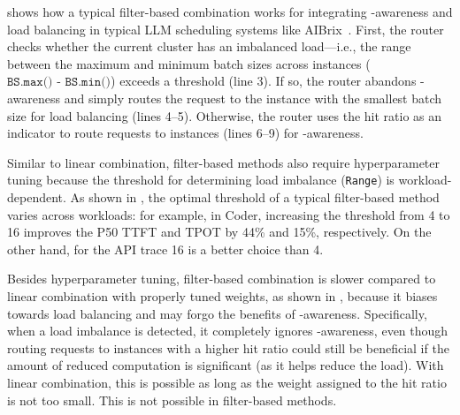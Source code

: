 {} shows how a typical filter-based combination works for
integrating {\kvcache}-awareness and load balancing
in typical LLM scheduling systems like AIBrix~\cite{aibrix}.
First, the router checks whether the current cluster has an imbalanced load---i.e.,
the range between the maximum and minimum batch sizes across instances (\(\texttt{BS.max() - BS.min()}\)) exceeds a threshold (line 3).
If so, the router abandons {\kvcache}-awareness and simply routes the request to the instance
with the smallest batch size for load balancing (lines 4--5).
Otherwise, the router uses the {\kvcache} hit ratio as an indicator to route requests to instances (lines 6--9) for {\kvcache}-awareness.

Similar to linear combination, filter-based methods also require
hyperparameter tuning because the threshold for determining load imbalance (\texttt{Range})
is workload-dependent.
As shown in {},
the optimal threshold of a typical filter-based method~\cite{aibrix} varies across workloads:
for example, in Coder, increasing the threshold from 4 to 16 improves
the P50 TTFT and TPOT by 44\% and 15\%, respectively. 
On the other hand, for the API trace 16 is a better choice than 4. 


Besides hyperparameter tuning, filter-based combination is slower
compared to linear combination with properly tuned weights,
as shown in {}, 
because it biases towards load balancing and may forgo the benefits of {\kvcache}-awareness. 
Specifically, when a load imbalance is detected, it completely ignores {\kvcache}-awareness,
even though routing requests to instances with a higher {\kvcache} hit ratio could still be beneficial
if the amount of reduced computation is significant (as it helps reduce the load).
With linear combination, this is possible as long as the weight
assigned to the {\kvcache} hit ratio is not too small. 
This is not possible in filter-based methods. 

